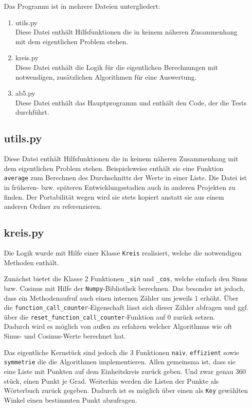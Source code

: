 \documentclass{scrartcl}
\begin{document}
	Das Programm ist in mehrere Dateien untergliedert:
	
	\begin{enumerate}
		\item utils.py \\ Diese Datei enthält Hilfsfunktionen die in keinem näheren Zusammenhang mit dem eigentlichen Problem stehen. 
		\item kreis.py \\ Diese Datei enthält die Logik für die eigentlichen Berechnungen mit notwendigen, zusätzlichen Algorithmen für eine Auswertung.
		\item ab5.py \\ Diese Datei enthält das Hauptprogramm und enthält den Code, der die Tests durchführt.
	\end{enumerate}
	
	\subsection{utils.py}
	
	Diese Datei enthält Hilfsfunktionen die in keinem näheren Zusammenhang mit dem eigentlichen Problem stehen. Beispielsweise enthält sie eine Funktion \verb|average| zum Berechnen des Durchschnitts der Werte in einer Liste. Die Datei ist in früheren- bzw. späteren Entwicklungsstadien auch in anderen Projekten zu finden. Der Portabilität wegen wird sie stets kopiert anstatt sie aus einem anderen Ordner zu referenzieren.
	
	\subsection{kreis.py}
	
	Die Logik wurde mit Hilfe einer Klasse \verb|Kreis| realisiert, welche die notwendigen Methoden enthält.
	
	Zunächst bietet die Klasse 2 Funktionen \verb|_sin| und \verb|_cos|, welche einfach den Sinus bzw. Cosinus mit Hilfe der \verb|Numpy|-Bibliothek berechnen. Das besonder ist jedoch, dass ein Methodenaufruf auch einen internen Zähler um jeweils 1 erhöht. Über die \verb|function_call_counter|-Eigenschaft lässt sich dieser Zähler abfragen und ggf. über die \verb|reset_function_call_counter|-Funktion auf 0 zurück setzen. \\
	Dadurch wird es möglich von außen zu erfahren welcher Algorithmus wie oft Sinus- und Cosinus-Werte berechnet hat.
	
	Das eigentliche Kernstück sind jedoch die 3 Funktionen \verb|naiv|, \verb|effizient| sowie \verb|symmetrie| die die Algorithmen implementieren. Allen gemeinsma ist, dass sie eine Liste mit Punkten auf dem Einheitskreis zurück geben. Und zwar genau 360 stück, einen Punkt je Grad. Weiterhin werden die Listen der Punkte als Wörterbuch zurück gegeben. Dadurch ist es möglich über einen als \verb|Key| gewählten Winkel einen bestimmten Punkt abzufragen.
	
\end{document}
